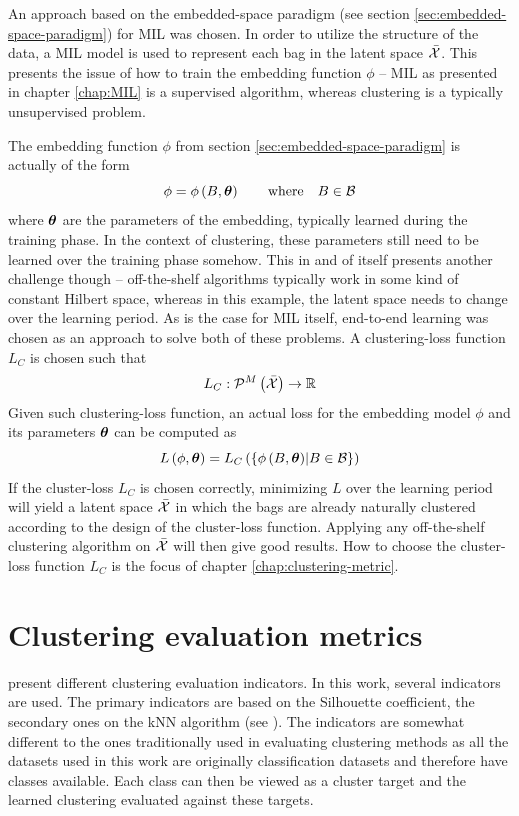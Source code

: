 An approach based on the embedded-space paradigm (see section \ref{sec:embedded-space-paradigm}) for MIL was chosen. In order to utilize the structure of the data, a MIL model is used to represent each bag in the latent space \( \bar{\mathcal{X}} \). This presents the issue of how to train the embedding function \( \phi \) -- MIL as presented in chapter \ref{chap:MIL} is a supervised algorithm, whereas clustering is a typically unsupervised problem.

The embedding function \( \phi \) from section \ref{sec:embedded-space-paradigm} is actually of the form
\[ \phi = \phi \left( B, \bm{\theta} \right) \qquad \text{where} \quad B \in \mathcal{B} \]
where \( \bm{\theta} \) are the parameters of the embedding, typically learned during the training phase. In the context of clustering, these parameters still need to be learned over the training phase somehow. This in and of itself presents another challenge though -- off-the-shelf algorithms typically work in some kind of constant Hilbert space, whereas in this example, the latent space needs to change over the learning period. As is the case for MIL itself, end-to-end learning was chosen as an approach to solve both of these problems. A clustering-loss function \( L_C \) is chosen such that
\[ L_C: \mathcal{P}^M \left( \bar{\mathcal{X}} \right) \to \mathbb{R} \]
Given such clustering-loss function, an actual loss for the embedding model \( \phi \) and its parameters \( \bm{\theta} \) can be computed as
\[ L \left( \phi, \bm{\theta} \right) = L_C \left( \left\{ \phi \left( B, \bm{\theta} \right) \middle| B \in \mathcal{B} \right\} \right) \]
If the cluster-loss \( L_C \) is chosen correctly, minimizing \( L \) over the learning period will yield a latent space \( \bar{\mathcal{X}} \) in which the bags are already naturally clustered according to the design of the cluster-loss function. Applying any off-the-shelf clustering algorithm on \( \bar{\mathcal{X}} \) will then give good results. How to choose the cluster-loss function \( L_C \) is the focus of chapter \ref{chap:clustering-metric}.

\section{Clustering evaluation metrics}\label{sec:clustering-metrics}

\cite{xu_comprehensive_2015} present different clustering evaluation indicators. In this work, several indicators are used. The primary indicators are based on the Silhouette coefficient, the secondary ones on the kNN algorithm (see \cite{dasarathy_nearest_1991}). The indicators are somewhat different to the ones traditionally used in evaluating clustering methods as all the datasets used in this work are originally classification datasets and therefore have classes available. Each class can then be viewed as a cluster target and the learned clustering evaluated against these targets.

